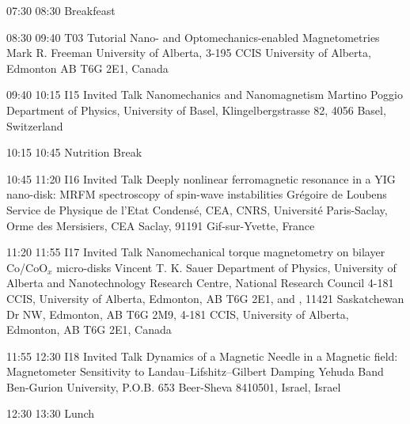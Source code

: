 \begin{confbreak}
{07:30}
{08:30}
{Breakfeast}
\end{confbreak}

 

\begin{talk}
{08:30}
{09:40}
{T03}
{Tutorial}
{Nano- and Optomechanics-enabled Magnetometries}
{Mark R. Freeman}
{University of Alberta, 3-195 CCIS University of Alberta, Edmonton AB T6G 2E1, Canada}
\end{talk}

\begin{talk}
{09:40}
{10:15}
{I15}
{Invited Talk}
{Nanomechanics and Nanomagnetism}
{Martino Poggio}
{Department of Physics, University of Basel, Klingelbergstrasse 82, 4056 Basel, Switzerland}
\end{talk}

\begin{confbreak}
{10:15}
{10:45}
{Nutrition Break}
\end{confbreak}

\begin{talk}
{10:45}
{11:20}
{I16}
{Invited Talk}
{Deeply nonlinear ferromagnetic resonance in a YIG nano-disk:  MRFM spectroscopy of spin-wave instabilities}
{Grégoire de Loubens}
{Service de Physique de l'Etat Condensé, CEA, CNRS, Université Paris-Saclay, Orme des Mersisiers, CEA Saclay, 91191 Gif-sur-Yvette, France}
\end{talk}

\begin{talk}
{11:20}
{11:55}
{I17}
{Invited Talk}
{Nanomechanical torque magnetometry on bilayer Co/CoO$_{x}$ micro-disks}
{Vincent T. K. Sauer}
{Department of Physics, University of Alberta and Nanotechnology Research Centre, National Research Council 4-181 CCIS, University of Alberta, Edmonton, AB  T6G 2E1, and , 11421 Saskatchewan Dr NW, Edmonton, AB T6G 2M9, 4-181 CCIS, University of Alberta, Edmonton, AB  T6G 2E1, Canada}
\end{talk}

\begin{talk}
{11:55}
{12:30}
{I18}
{Invited Talk}
{Dynamics of a Magnetic Needle in a Magnetic field: Magnetometer Sensitivity to Landau--Lifshitz--Gilbert Damping}
{Yehuda Band}
{Ben-Gurion University, P.O.B. 653 Beer-Sheva 8410501, Israel, Israel}
\end{talk}

\begin{confbreak}
{12:30}
{13:30}
{Lunch}
\end{confbreak}

